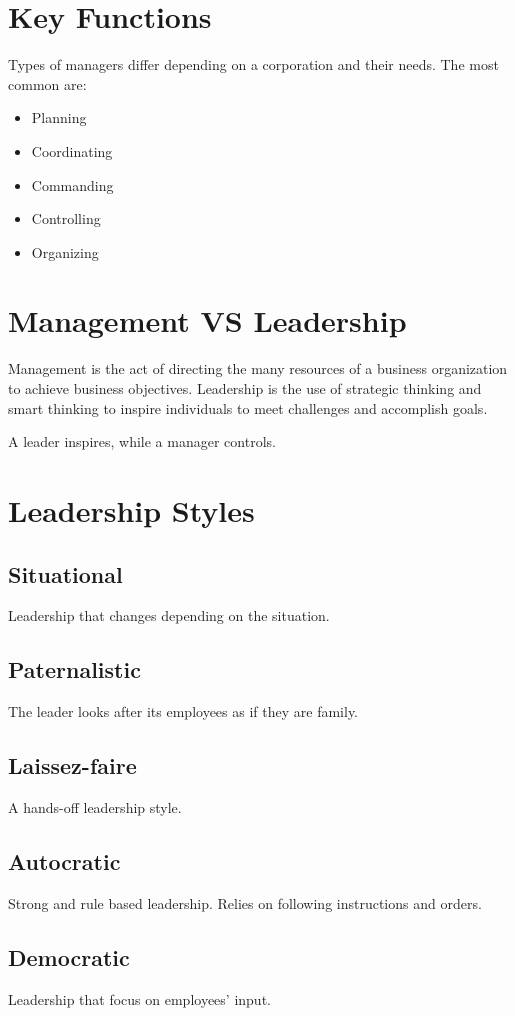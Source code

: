 \documentclass{standalone}
\begin{document}
\section{Key Functions}
Types of managers differ depending on a corporation and their needs.
The most common are:
\begin{itemize}
	\item Planning
	\item Coordinating
	\item Commanding
	\item Controlling
	\item Organizing
\end{itemize}

\section{Management VS Leadership}
Management is the act of directing the many resources of a business organization to achieve business objectives.
Leadership is the use of strategic thinking and smart thinking to inspire individuals to meet challenges and accomplish goals.

A leader inspires, while a manager controls.

\section{Leadership Styles}
\subsection{Situational}
Leadership that changes depending on the situation.

\subsection{Paternalistic}
The leader looks after its employees as if they are family.

\subsection{Laissez-faire}
A hands-off leadership style.

\subsection{Autocratic}
Strong and rule based leadership.
Relies on following instructions and orders.

\subsection{Democratic}
Leadership that focus on employees' input.
\end{document}
